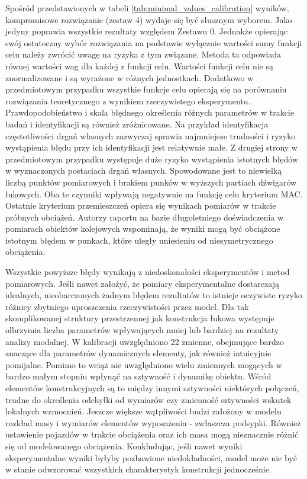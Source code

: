 Spośród przedstawionych w tabeli \ref{tab:minimal_values_calibration} wyników, kompromisowe rozwiązanie (zestaw 4) wydaje się być słusznym wyborem. Jako jedyny poprawia wszystkie rezultaty względem Zestawu 0. Jednakże opierając swój ostateczny wybór rozwiązania na podstawie wyłącznie wartości sumy funkcji celu należy zwrócić uwagę na ryzyka z tym związane. Metoda ta odpowiada równej wartości wag dla każdej z funkcji celu. Wartości funkcji celu nie są znormalizowane i są wyrażone w różnych jednostkach. Dodatkowo w przedmiotowym przypadku wszystkie funkcje celu opierają się na porównaniu rozwiązania teoretycznego z wynikiem rzeczywistego eksperymentu. Prawdopodobieństwo i skala błędnego określenia różnych parametrów w trakcie badań i identyfikacji są również zróżnicowane. Na przykład identyfikacja częstotliwości drgań własnych zazwyczaj sprawia najmniejsze trudności i ryzyko wystąpienia błędu przy ich identyfikacji jest relatywnie małe. Z drugiej strony w przedmiotowym przypadku występuje duże ryzyko wystąpienia istotnych błędów w wyznaczonych postaciach drgań własnych. Spowodowane jest to niewielką liczbą punktów pomiarowych i brakiem punków w wyższych partiach dźwigarów łukowych. Oba te czynniki wpływają negatywnie na funkcję celu kryterium MAC. Ostatnie kryterium przemieszczeń opiera się wynikach pomiarów w trakcie próbnych obciążeń. Autorzy raportu \parencite{Salamak2014} na bazie długoletniego doświadczenia w pomiarach obiektów kolejowych wspominają, że wyniki mogą być obciążone istotnym błędem w punkach, które uległy uniesieniu od niesymetrycznego obciążenia.

Wszystkie powyższe błędy wynikają z niedoskonałości eksperymentów i metod pomiarowych. Jeśli nawet założyć, że pomiary eksperymentalne dostarczają idealnych, nieobarczonych żadnym błędem rezultatów to istnieje oczywiste ryzyko różnicy zbytniego uproszczenia rzeczywistości przez model. Dla tak skomplikowanej struktury przestrzennej jak konstrukcja łukowa występuje olbrzymia liczba parametrów wpływających mniej lub bardziej na rezultaty analizy modalnej. W kalibracji uwzględniono 22 zmienne, obejmujące bardzo znaczące dla parametrów dynamicznych elementy, jak również intuicyjnie pomijalne. Pomimo to wciąż nie uwzględniono wielu zmiennych mogących w bardzo małym stopniu wpłynąć na sztywność i dynamikę obiektu. Wśród elementów konstrukcyjnych są to między innymi sztywności niektórych połączeń, trudne do określenia odchyłki od wymiarów czy zmienność sztywności wskutek lokalnych wzmocnień. Jeszcze większe wątpliwości budzi założony w modelu rozkład masy i wymiarów elementów wyposażenia - zwłaszcza podsypki. Również ustawienie pojazdów w trakcie obciążenia oraz ich masa mogą nieznacznie różnić się od modelowanego obciążenia. Konkludując, jeśli nawet wyniki eksperymentalne wyniki byłyby pozbawione niedokładności, model może nie być w stanie odwzorować wszystkich charakterystyk konstrukcji jednocześnie.

